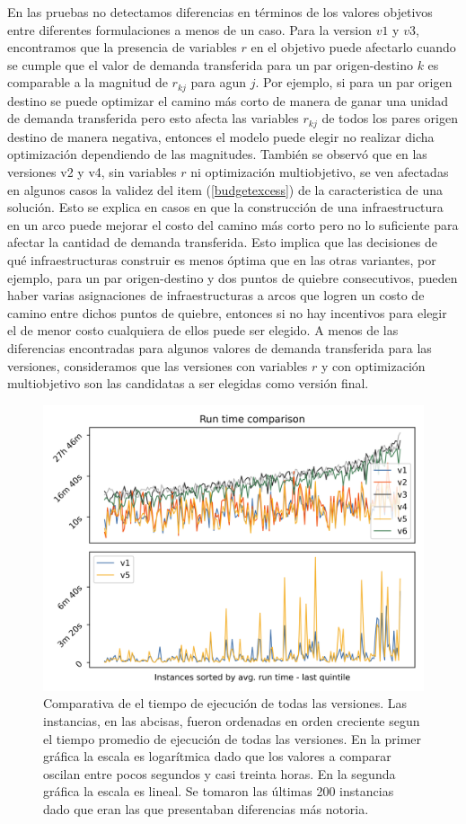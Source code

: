 \documentclass{article}
\begin{document}
  En las pruebas no detectamos diferencias en términos de los valores objetivos entre diferentes formulaciones a menos de un caso. Para la version $v1$ y $v3$, encontramos que la presencia de variables $r$ en el objetivo puede afectarlo cuando se cumple que el valor de demanda transferida para un par origen-destino $k$ es comparable a la magnitud de $r_{kj}$ para agun $j$. Por ejemplo, si para un par origen destino se puede optimizar el camino más corto de manera de ganar una unidad de demanda transferida pero esto afecta las variables $r_{kj}$ de todos los pares origen destino de manera negativa, entonces el modelo puede elegir no realizar dicha optimización dependiendo de las magnitudes.
  También se observó que en las versiones v2 y v4, sin variables $r$ ni optimización multiobjetivo, se ven afectadas en algunos casos la validez del item (\ref{budgetexcess}) de la caracteristica de una solución. Esto se explica en casos en que la construcción de una infraestructura en un arco puede mejorar el costo del camino más corto pero no lo suficiente para afectar la cantidad de demanda transferida. Esto implica que las decisiones de qué infraestructuras construir es menos óptima que en las otras variantes, por ejemplo, para un par origen-destino y dos puntos de quiebre consecutivos, pueden haber varias asignaciones de infraestructuras a arcos que logren un costo de camino entre dichos puntos de quiebre, entonces si no hay incentivos para elegir el de menor costo cualquiera de ellos puede ser elegido.
  A menos de las diferencias encontradas para algunos valores de demanda transferida para las versiones, consideramos que las versiones con variables $r$ y con optimización multiobjetivo son las candidatas a ser elegidas como versión final.

  \begin{figure}[h!]
    \centering
    \includegraphics[width=12cm]{../resources/run_time_comparsion.png}
    \caption{Comparativa de el tiempo de ejecución de todas las versiones. Las instancias, en las abcisas, fueron ordenadas en orden creciente segun el tiempo promedio de ejecución de todas las versiones. En la primer gráfica la escala es logarítmica dado que los valores a comparar oscilan entre pocos segundos y casi treinta horas. En la segunda gráfica la escala es lineal. Se tomaron las últimas 200 instancias dado que eran las que presentaban diferencias más notoria.}
    \label{fig:runtimecomparison}
  \end{figure}
\end{document}
